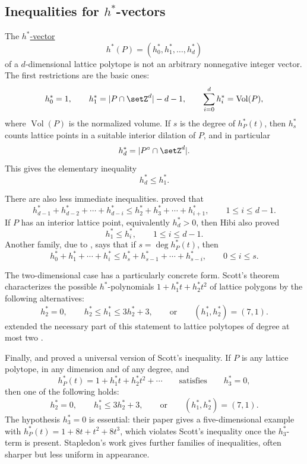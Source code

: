 \subsection[hStarInequalities]{Inequalities for \(h^*\)-vectors}

The \hyperref[hStarVector]{\(h^*\)-vector}
\[
  h^*(P)=(h^*_0,h^*_1,\dotsc,h^*_d)
\]
of a \(d\)-dimensional lattice polytope is not an arbitrary nonnegative
integer vector.  The first restrictions are the basic ones:
\[
  h^*_0=1,\qquad
  h^*_1=|P\cap \setZ^d|-d-1,\qquad
  \sum_{i=0}^{d} h_i^*=\operatorname{Vol}(P),
\]
where \(\operatorname{Vol}(P)\) is the normalized volume.  If \(s\) is the
degree of \(h^*_P(t)\), then \(h^*_s\) counts lattice points in a suitable
interior dilation of \(P\), and in particular
\[
  h^*_d=|P^\circ\cap \setZ^d|.
\]
This gives the elementary inequality
\[
  h^*_d\leq h^*_1.
\]

There are also less immediate inequalities.   proved
\cite{Hibi1994LowerBound} that
\[
  h^*_{d-1}+h^*_{d-2}+\dotsb+h^*_{d-i}
  \leq
  h^*_2+h^*_3+\dotsb+h^*_{i+1},
  \qquad 1\leq i\leq d-1.
\]
If \(P\) has an interior lattice point, equivalently \(h^*_d>0\), then Hibi
also proved
\[
  h^*_1\leq h^*_i,\qquad 1\leq i\leq d-1.
\]
Another family, due to 
\cite{Stanley1991HilbertFunction}, says that if \(s=\deg h^*_P(t)\), then
\[
  h^*_0+h^*_1+\dotsb+h^*_i
  \leq
  h^*_s+h^*_{s-1}+\dotsb+h^*_{s-i},
  \qquad 0\leq i\leq s.
\]

The two-dimensional case has a particularly concrete form.  Scott's theorem
\cite{Scott1976ConvexLatticePolygons} characterizes the possible
\(h^*\)-polynomials \(1+h^*_1t+h^*_2t^2\) of lattice polygons by the
following alternatives:
\[
  h^*_2=0,\qquad
  h^*_2\leq h^*_1\leq 3h^*_2+3,\qquad
  \text{or}\qquad (h^*_1,h^*_2)=(7,1).
\]
 extended the necessary part of this statement to
lattice polytopes of degree at most two \cite{Treutlein2010DegreeTwo}.

Finally,  and 
\cite{BallettiHigashitani2018Universal} proved a universal version of Scott's
inequality.  If \(P\) is any lattice polytope, in any
dimension and of any degree, and
\[
  h^*_P(t)=1+h^*_1t+h^*_2t^2+\dotsb
  \qquad\text{satisfies}\qquad h^*_3=0,
\]
then one of the following holds:
\[
  h^*_2=0,\qquad
  h^*_1\leq 3h^*_2+3,\qquad
  \text{or}\qquad (h^*_1,h^*_2)=(7,1).
\]
The hypothesis \(h^*_3=0\) is essential: their paper gives a
five-dimensional example with \(h^*_P(t)=1+8t+t^2+8t^3\), which violates
Scott's inequality once the \(h^*_3\)-term is present.  Stapledon's work
\cite{Stapledon2009Inequalities,Stapledon2016Additive} gives further
families of inequalities, often sharper but less uniform in appearance.

